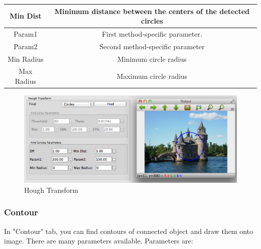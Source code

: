 \documentclass{article}
\begin{document}
\begin{table}[H]
\begin{center}
\begin{tabular}{|c|c|l|l|l|}
Min Dist               & \multicolumn{4}{|c|}{Minimum distance between the centers of the detected circles}                                                                                     \\ \hline
Param1                 & \multicolumn{4}{|c|}{First method-specific parameter.}      \\ \hline
Param2                 & \multicolumn{4}{|c|}{Second method-specific parameter} \\ \hline
Min Radius             & \multicolumn{4}{|c|}{Minimum circle radius}                                                                                                                            \\ \hline
Max Radius             & \multicolumn{4}{|c|}{Maximum circle radius}                                                                                                                            \\ \hline
\end{tabular}
\end{center}
\end{table}

\begin{figure}[H]
\begin{center}
\includegraphics[scale=0.5]{toolboxHough.png}
\caption{Hough Transform}
\end{center}
\end{figure}	

\subsubsection{Contour}
In "Contour" tab, you can find contours of connected object and draw them onto image. There are many parameters available. Parameters are:
\end{document}
